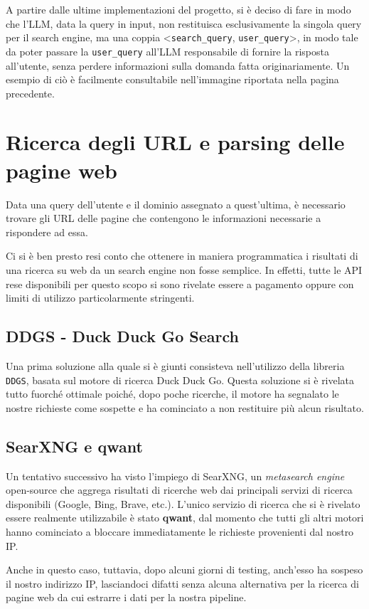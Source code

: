 A partire dalle ultime implementazioni del progetto, si è deciso di fare in modo che l'LLM, data la query in input, non restituisca esclusivamente la singola query per il search engine, ma una coppia <\texttt{search\_query}, \texttt{user\_query}>, in modo tale da poter passare la \texttt{user\_query} all'LLM responsabile di fornire la risposta all'utente, senza perdere informazioni sulla domanda fatta originariamente. Un esempio di ciò è facilmente consultabile nell'immagine riportata nella pagina precedente.

\section{Ricerca degli URL e parsing delle pagine web}
Data una query dell'utente e il dominio assegnato a quest'ultima, è necessario trovare gli URL delle pagine che contengono le informazioni necessarie a rispondere ad essa.

Ci si è ben presto resi conto che ottenere in maniera programmatica i risultati di una ricerca su web da un search engine non fosse semplice. In effetti, tutte le API rese disponibili per questo scopo si sono rivelate essere a pagamento oppure con limiti di utilizzo particolarmente stringenti.

\subsection{DDGS - Duck Duck Go Search}
Una prima soluzione alla quale si è giunti consisteva nell'utilizzo della libreria \texttt{DDGS}, basata sul motore di ricerca Duck Duck Go. Questa soluzione si è rivelata tutto fuorché ottimale poiché, dopo poche ricerche, il motore ha segnalato le nostre richieste come sospette e ha cominciato a non restituire più alcun risultato.

\subsection{SearXNG e qwant}
Un tentativo successivo ha visto l'impiego di SearXNG, un \textit{metasearch engine} open-source che aggrega risultati di ricerche web dai principali servizi di ricerca disponibili (Google, Bing, Brave, etc.). L'unico servizio di ricerca che si è rivelato essere realmente utilizzabile è stato \textbf{qwant}, dal momento che tutti gli altri motori hanno cominciato a bloccare immediatamente le richieste provenienti dal nostro IP.

Anche in questo caso, tuttavia, dopo alcuni giorni di testing, anch'esso ha sospeso il nostro indirizzo IP, lasciandoci difatti senza alcuna alternativa per la ricerca di pagine web da cui estrarre i dati per la nostra pipeline.

